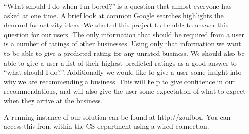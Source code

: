 \label{sec:problem}

``What should I do when I'm bored?''  is a question that almost everyone has
asked at one time. A brief look at common Google searches highlights the demand
for activity ideas. We started this project to be able to answer this question
for our users. The only information that should be required from a user is 
a number of ratings of other businesses. Using only that information we want to
be able to give a predicted rating for any unrated business. We should also be
able to give a user a list of their highest predicted ratings as a good answer
to ``what should I do?''. Additionally we would like to give a user some insight
into why we are recommending a business. This will help to give confidence in
our recommendations, and will also give the user some expectation of what to
expect when they arrive at the business.

A running instance of our solution can be found at http://zoufbox.
You can access this from within the CS department using a wired connection.

